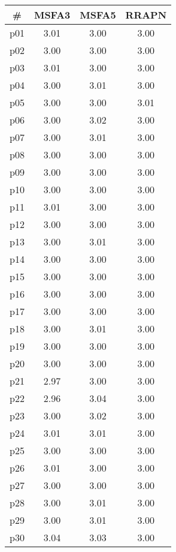 \begin{tabular}{cccc}
\toprule
\textbf{\#} & \textbf{MSFA3} & \textbf{MSFA5} & \textbf{RRAPN}\\
\midrule
p01 & 3.01 & 3.00 & 3.00\\
p02 & 3.00 & 3.00 & 3.00\\
p03 & 3.01 & 3.00 & 3.00\\
p04 & 3.00 & 3.01 & 3.00\\
p05 & 3.00 & 3.00 & 3.01\\
p06 & 3.00 & 3.02 & 3.00\\
p07 & 3.00 & 3.01 & 3.00\\
p08 & 3.00 & 3.00 & 3.00\\
p09 & 3.00 & 3.00 & 3.00\\
p10 & 3.00 & 3.00 & 3.00\\
p11 & 3.01 & 3.00 & 3.00\\
p12 & 3.00 & 3.00 & 3.00\\
p13 & 3.00 & 3.01 & 3.00\\
p14 & 3.00 & 3.00 & 3.00\\
p15 & 3.00 & 3.00 & 3.00\\
p16 & 3.00 & 3.00 & 3.00\\
p17 & 3.00 & 3.00 & 3.00\\
p18 & 3.00 & 3.01 & 3.00\\
p19 & 3.00 & 3.00 & 3.00\\
p20 & 3.00 & 3.00 & 3.00\\
p21 & 2.97 & 3.00 & 3.00\\
p22 & 2.96 & 3.04 & 3.00\\
p23 & 3.00 & 3.02 & 3.00\\
p24 & 3.01 & 3.01 & 3.00\\
p25 & 3.00 & 3.00 & 3.00\\
p26 & 3.01 & 3.00 & 3.00\\
p27 & 3.00 & 3.00 & 3.00\\
p28 & 3.00 & 3.01 & 3.00\\
p29 & 3.00 & 3.01 & 3.00\\
p30 & 3.04 & 3.03 & 3.00\\
\bottomrule
\end{tabular}

